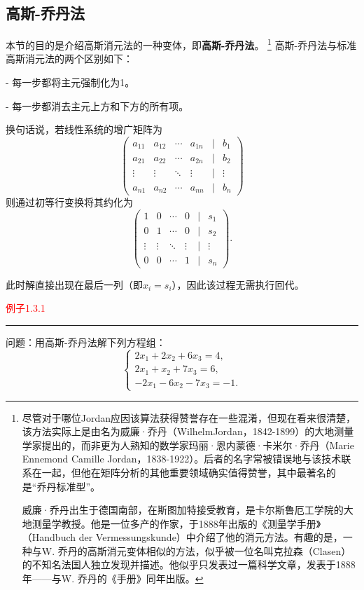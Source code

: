 \subsection{高斯-乔丹法}
本节的目的是介绍高斯消元法的一种变体，即\textbf{高斯-乔丹法}。
\footnote{尽管对于哪位Jordan应因该算法获得赞誉存在一些混淆，但现在看来很清楚，该方法实际上是由名为威廉·乔丹（WilhelmJordan，1842-1899）的大地测量学家提出的，而非更为人熟知的数学家玛丽·恩内蒙德·卡米尔·乔丹（Marie Ennemond Camille Jordan，1838-1922）。后者的名字常被错误地与该技术联系在一起，但他在矩阵分析的其他重要领域确实值得赞誉，其中最著名的是“乔丹标准型”。
	
威廉·乔丹出生于德国南部，在斯图加特接受教育，是卡尔斯鲁厄工学院的大地测量学教授。他是一位多产的作家，于1888年出版的《测量学手册》（Handbuch der Vermessungskunde）中介绍了他的消元方法。有趣的是，一种与W. 乔丹的高斯消元变体相似的方法，似乎被一位名叫克拉森（Clasen）的不知名法国人独立发现并描述。他似乎只发表过一篇科学文章，发表于1888年——与W. 乔丹的《手册》同年出版。}
高斯-乔丹法与标准高斯消元法的两个区别如下：

- 每一步都将主元强制化为1。

- 每一步都消去主元上方和下方的所有项。

换句话说，若线性系统的增广矩阵为
\[
\begin{pmatrix}
	a_{11} & a_{12} & \cdots & a_{1n} & \big| & b_1 \\
	a_{21} & a_{22} & \cdots & a_{2n} & \big| & b_2 \\
	\vdots & \vdots & \ddots & \vdots & \big| & \vdots \\
	a_{n1} & a_{n2} & \cdots & a_{nn} & \big| & b_n
\end{pmatrix}
\]
则通过初等行变换将其约化为
\[
\begin{pmatrix}
	1 & 0 & \cdots & 0 & \big| & s_1 \\
	0 & 1 & \cdots & 0 & \big| & s_2 \\
	\vdots & \vdots & \ddots & \vdots & \big| & \vdots \\
	0 & 0 & \cdots & 1 & \big| & s_n
\end{pmatrix}.
\]

此时解直接出现在最后一列（即\( x_i = s_i \)），因此该过程无需执行回代。

\textcolor{red}{例子1.3.1}
\color{red}\rule{\textwidth}{0.4pt}\color{black}

问题：用高斯-乔丹法解下列方程组：
\[
\begin{cases}
	2x_1 + 2x_2 + 6x_3 = 4, \\
	2x_1 + x_2 + 7x_3 = 6, \\
	-2x_1 - 6x_2 - 7x_3 = -1.
\end{cases}
\]

